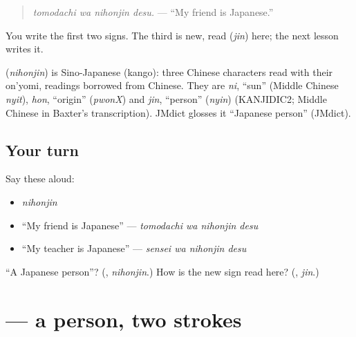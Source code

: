 \begin{quote}
\textbf{ }
\end{quote}

\begin{quote}
\emph{tomodachi wa nihonjin desu.} — \textquotedblleft{}My friend is Japanese.\textquotedblright{}
\end{quote}

You write the first two signs. The third is new, read \textbf{} (\emph{jin}) here; the next lesson writes it.

\begin{cousinweb}
\textbf{} (\emph{nihonjin}) is Sino-Japanese (kango): three Chinese characters read with their on'yomi, readings borrowed from Chinese. They are \emph{ni}, \textquotedblleft{}sun\textquotedblright{} (Middle Chinese \emph{nyit}), \emph{hon}, \textquotedblleft{}origin\textquotedblright{} (\emph{pwonX}) and \emph{jin}, \textquotedblleft{}person\textquotedblright{} (\emph{nyin}) (KANJIDIC2; Middle Chinese in Baxter's transcription). JMdict glosses it \textquotedblleft{}Japanese person\textquotedblright{} (JMdict).
\end{cousinweb}

\subsection*{Your turn}
Say these aloud:

\begin{itemize}
\raggedright
  \item \emph{nihonjin}
  \item \textquotedblleft{}My friend is Japanese\textquotedblright{} — \emph{tomodachi wa nihonjin desu}
  \item \textquotedblleft{}My teacher is Japanese\textquotedblright{} — \emph{sensei wa nihonjin desu}
\end{itemize}

\begin{tcolorbox}[breakable,colback=teal!4,colframe=teal!35!black,title={Before you move on}]
\textquotedblleft{}A Japanese person\textquotedblright{}? (\textbf{}, \emph{nihonjin}.) How is the new sign read here? (\textbf{}, \emph{jin}.)
\end{tcolorbox}
\section[\texorpdfstring{\ja{人} (jin)}{人 (jin)}]{ — a person, two strokes}

